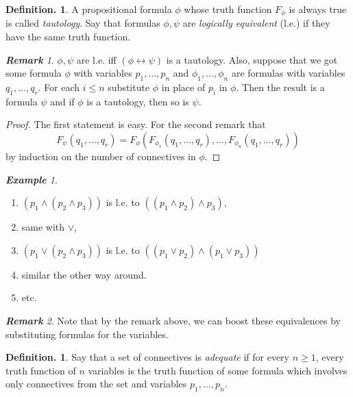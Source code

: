 \documentclass[a4paper,oneside,11pt,DIV=12,parskip=half]{scrartcl}
\theoremstyle{plain}
\theoremstyle{definition}
\newtheorem{definition}[theorem]{Definition.}
\newtheorem{remark, definition}[theorem]{Remark and Definition.}
\newtheorem{lemma, definition}[theorem]{Lemma and Definition.}
\newtheorem{theorem, definition}[theorem]{Theorem and Definition.}
\theoremstyle{remark}
\newtheorem*{remark}{\textbf{Remark}}
\newtheorem*{example}{\textbf{Example}}
\newtheorem*{remark, example}{\textbf{Remark and Exercise}}
\begin{document}
\begin{definition}
A propositional formula $\phi$ whose truth function $F_{\phi}$ is always true is called \emph{tautology}.
Say that formulas $\phi, \psi$ are \emph{logically equivalent} (l.e.) if they have the same truth function.
\end{definition}

\begin{remark}
$\phi,\psi$ are l.e. iff $(\phi \leftrightarrow \psi)$ is a tautology.
Also, suppose that we got some formula $\phi$ with variables $p_1, \dots, p_n$ and $\phi_1,\dots,\phi_n$ are formulas with variables $q_1, \dots, q_r$.
For each $i \leq n$ substitute $\phi$ in place of $p_i$ in $\phi$. Then the result is a formula $ \psi$ and if $\phi$ is a tautology, then so is $\psi$.
\end{remark}

\begin{proof}
The first statement is easy. For the second remark that
	\[ F_{\psi}(q_1, \dots, q_r) = F_{\phi}(F_{\phi_1}(q_1, \dots, q_r), \dots, F_{\phi_n}(q_1, \dots, q_r)) \]
by induction on the number of connectives in $\phi$.
\end{proof}

\begin{example}
\begin{enumerate}
\item $(p_1 \land ( p_2 \land p_3))$ is l.e. to $((p_1 \land p_2) \land p_3)$,
\item same with $ \lor $,
\item $(p_1 \lor (p_2 \land p_3))$ is l.e. to $((p_1 \lor p_2) \land (p_1 \lor p_3))$ 
\item similar the other way around.
\item etc.

\end{enumerate}
\end{example}

\begin{remark}
Note that by the remark above, we can boost these equivalences by substituting formulas for the variables.
\end{remark}

\begin{definition}

Say that a set of connectives is \emph{adequate} if for every $n \geq 1$, every truth function of $n$ variables is the truth function of some formula which involves only connectives from the set and variables $p_1, \dots, p_n$.
\end{definition}
\end{document}
